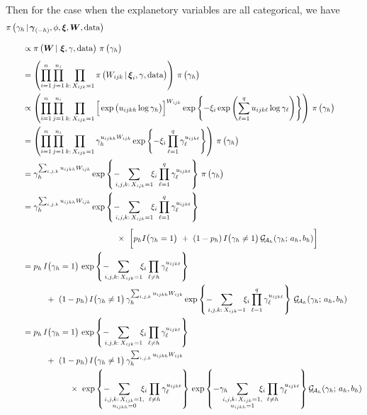 \documentclass[11pt]{article}
\renewcommand{\vec}{\boldsymbol}
\newcommand{\barS}{\,|\,}
\newcommand{\ind}{I}
\newcommand{\gammaExpr}{ -\hspace{3mm} \sum_{\mathclap{i,j,k{:}\, X_{ijk}=1}} \hspace{4mm} \xi_i \prod_{\ell=1}^q \gamma_\ell^{ u_{ijk\ell} } }
\newcommand{\gammaExprNoH}{ -\hspace{3mm} \sum_{\mathclap{i,j,k{:}\, X_{ijk}=1}} \hspace{4mm} \xi_i \prod_{\ell \ne h} \gamma_\ell^{ u_{ijk\ell} } }
\newcommand{\gammaExprUisZero}{ \hspace{3mm} \sum_{\mathclap{\substack{i,j,k{:}\, X_{ijk}=1, \\ u_{ijkh} = 0}}} \hspace{4mm} \xi_i \prod_{\ell \ne h} \gamma_\ell^{ u_{ijk\ell} } }
\newcommand{\gammaExprUisOne}{ \hspace{3mm} \sum_{\mathclap{\substack{i,j,k{:}\, X_{ijk}=1, \\ u_{ijkh} = 1}}} \hspace{4mm} \xi_i \prod_{\ell \ne h} \gamma_\ell^{ u_{ijk\ell} } }
\begin{document}
\begin{enumerate}[label=Step \arabic*., leftmargin=13mm, itemsep=10mm]
Then for the case when the explanetory variables are all categorical, we have
\begin{align*} \MoveEqLeft
\pi\, \big( \gamma_h \barS \vec{\gamma}_{(-h)}, \phi, \vec{\xi}, \vec{W}, \text{data} \big) \\[2ex]
& \propto \pi\, \big( \vec{W} \barS\, \vec{\xi}, \gamma, \text{data} \big)~ \pi\,\big( \gamma_h \big) \\[1ex]
&= \left( \prod_{i=1}^{n} \prod_{j=1}^{n_i} \prod_{k{:}\, X_{ijk} = 1} \pi\, \big( W_{ijk} \barS \vec{\xi}_i, \gamma, \text{data} \big) \right)\, \pi\,\big( \gamma_h \big) \\
&\propto \left( \prod_{i=1}^{n} \prod_{j=1}^{n_i} \prod_{k{:}\, X_{ijk} = 1} \Big[ \exp\big( u_{ijkh} \log \gamma_h \big) \Big]^{W_{ijk}} \exp\left\{ -\xi_i \exp\left( \sum_{\ell=1}^q u_{ijk\ell} \log \gamma_{\ell} \right) \right\} \right)\, \pi\,\big( \gamma_h \big) \\
&= \left( \prod_{i=1}^{n} \prod_{j=1}^{n_i} \prod_{k{:}\, X_{ijk} = 1} \gamma_h^{ u_{ijkh} W_{ijk} } \exp\left\{ -\xi_i \prod_{\ell=1}^q \gamma_\ell^{ u_{ijk\ell} } \right\} \right)\, \pi\,\big( \gamma_h \big) \\
&= \gamma_h^{ \sum_{i,j,k} u_{ijkh} W_{ijk} } \exp\left\{ \gammaExpr \right\}\, \pi\,\big( \gamma_h \big) \\
&= \gamma_h^{ \sum_{i,j,k} u_{ijkh} W_{ijk} } \exp\left\{ \gammaExpr \right\} \\[1ex]
& \hspace{40mm} \times~ \bigg[ p_h \ind\big( \gamma_h = 1 \big) ~+~ (1 - p_h)\, \ind\big( \gamma_h \ne 1 \big)\, \mathcal{G}_{\!\mathcal{A}_h} (\gamma_h;\, a_h,b_h) \bigg] \\
&= p_h\, \ind\big( \gamma_h = 1 \big)\, \exp\left\{ \gammaExprNoH \right\} \\
& \hspace{10mm} +~ (1 - p_h)\, \ind\big(\gamma_h \ne 1 \big)\, \gamma_h^{ \sum_{i,j,k} u_{ijkh} W_{ijk} } \exp\left\{ \gammaExpr \right\} \, \mathcal{G}_{\!\mathcal{A}_h} (\gamma_h;\, a_h,b_h) \\
&= p_h\, \ind\big( \gamma_h = 1 \big)\, \exp\left\{ \gammaExprNoH \right\} \\
& \hspace{10mm} +~ (1 - p_h)\, \ind\big(\gamma_h \ne 1 \big)\, \gamma_h^{ \sum_{i,j,k} u_{ijkh} W_{ijk} } \\
& \hspace{20mm} \times~ \exp\left\{ -\gammaExprUisZero \right\}\, \exp\left\{ -\gamma_h \gammaExprUisOne \right\} \mathcal{G}_{\!\mathcal{A}_h} (\gamma_h;\, a_h,b_h) \\

\end{align*}
\end{enumerate}
\end{document}
